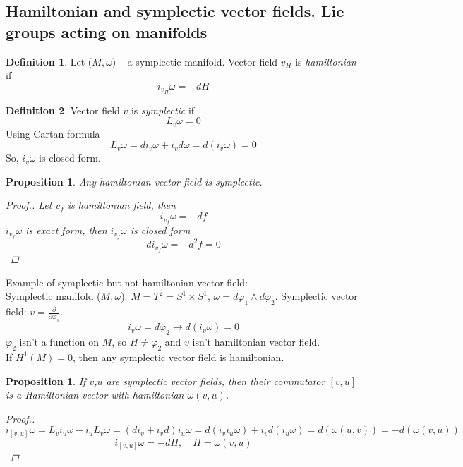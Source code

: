 \documentclass[12pt]{article}
\newtheorem{prop}[theorem]{Proposition}
\theoremstyle{definition}
\newtheorem{defin}{Definition}[]
\begin{document}
\subsection*{Hamiltonian and symplectic vector fields. Lie groups acting on manifolds}
\begin{defin}
    Let ($M,\omega$) -- a symplectic manifold. Vector field $v_H$ is \textit{hamiltonian} if
    \begin{equation}
        i_{v_H}\omega=-dH
    \end{equation}
\end{defin}
\begin{defin}
    Vector field $v$ is \textit{symplectic} if
    \begin{equation}
        L_v\omega=0
    \end{equation}
    Using Cartan formula
    \begin{equation}
        L_v\omega=di_v\omega+i_vd\omega=d(i_v\omega)=0
    \end{equation}
    So, $i_v\omega$ is closed form.
\end{defin}
\begin{prop}
    Any hamiltonian vector field is symplectic.
    \begin{proof}[Proof.]
        Let $v_f$ is hamiltonian field, then
        \begin{equation}
            i_{v_f}\omega=-df
        \end{equation}
        $i_{v_f}\omega$ is exact form, then $i_{v_f}\omega$ is closed form
        \begin{equation}
            di_{v_f}\omega=-d^2f=0
        \end{equation}
    \end{proof}
\end{prop}
Example of symplectic but not hamiltonian vector field:\\
Symplectic manifold ($M,\omega$): $M=T^2=S^1\times S^1$, $\omega=d\varphi_1\wedge d\varphi_2$.
Symplectic vector field: $v=\frac{\partial}{\partial\varphi_1}$.
\begin{equation}
    i_v\omega=d\varphi_2\rightarrow d(i_v\omega)=0
\end{equation}
$\varphi_2$ isn't a function on $M$, so $H\neq\varphi_2$ and $v$ isn't hamiltonian vector field.\\
If $H^1(M)=0$, then any symplectic vector field is hamiltonian.
\begin{prop}
    If $v$,$u$ are symplectic vector fields, then their commutator $[v,u]$ is a Hamiltonian vector with hamiltonian $\omega(v,u)$.
    \begin{proof}[Proof.]
        \begin{equation}
            i_{[v,u]}\omega=L_vi_u\omega-i_uL_v\omega=(di_v+i_vd)i_u\omega=d(i_vi_u\omega)+i_vd(i_u\omega)=d(\omega(u,v))=-d(\omega(v,u))
        \end{equation}
        \begin{equation}
            i_{[v,u]}\omega=-dH,\quad H=\omega(v,u)
        \end{equation}
    \end{proof}
\end{prop}
\end{document}
